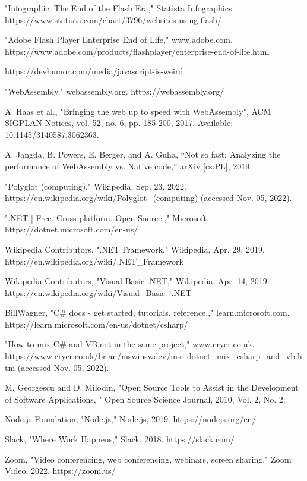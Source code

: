 \begin{thebibliography}{9}
"Infographic: The End of the Flash Era," Statista Infographics. https://www.statista.com/chart/3796/websites-using-flash/

"Adobe Flash Player Enterprise End of Life," www.adobe.com. https://www.adobe.com/products/flashplayer/enterprise-end-of-life.html

https://devhumor.com/media/javascript-is-weird

"WebAssembly," webassembly.org. https://webassembly.org/

A. Haas et al., "Bringing the web up to speed with WebAssembly", ACM SIGPLAN Notices, vol. 52, no. 6, pp. 185-200, 2017. Available: 10.1145/3140587.3062363.

A. Jangda, B. Powers, E. Berger, and A. Guha, “Not so fast: Analyzing the performance of WebAssembly vs. Native code,” arXiv [cs.PL], 2019.

"Polyglot (computing)," Wikipedia, Sep. 23, 2022. https://en.wikipedia.org/wiki/Polyglot\_(computing) (accessed Nov. 05, 2022).

".NET | Free. Cross-platform. Open Source.," Microsoft. https://dotnet.microsoft.com/en-us/

Wikipedia Contributors, ".NET Framework," Wikipedia, Apr. 29, 2019. https://en.wikipedia.org/wiki/.NET\_Framework

Wikipedia Contributors, "Visual Basic .NET," Wikipedia, Apr. 14, 2019. https://en.wikipedia.org/wiki/Visual\_Basic\_.NET

BillWagner, "C\# docs - get started, tutorials, reference.," learn.microsoft.com. https://learn.microsoft.com/en-us/dotnet/csharp/

"How to mix C\# and VB.net in the same project," www.cryer.co.uk. https://www.cryer.co.uk/brian/mswinswdev/ms\_dotnet\_mix\_csharp\_and\_vb.htm (accessed Nov. 05, 2022).

M. Georgescu and D. Milodin, "Open Source Tools to Assist in the Development of Software Applications, " Open Source Science Journal, 2010, Vol. 2, No. 2.

Node.js Foundation, "Node.js," Node.js, 2019. https://nodejs.org/en/

Slack, "Where Work Happens," Slack, 2018. https://slack.com/

Zoom, "Video conferencing, web conferencing, webinars, screen sharing," Zoom Video, 2022. https://zoom.us/


\end{thebibliography}
